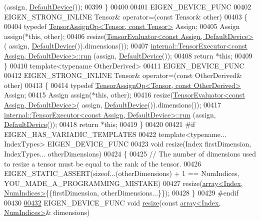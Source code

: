 \begin{DoxyCode}
      (assign, \hyperlink{struct_eigen_1_1_default_device}{DefaultDevice}());
00399     \}
00400 
00401     EIGEN\_DEVICE\_FUNC
00402     EIGEN\_STRONG\_INLINE Tensor& operator=(\textcolor{keyword}{const} Tensor& other)
00403     \{
00404       \textcolor{keyword}{typedef} \hyperlink{class_eigen_1_1_tensor_assign_op}{TensorAssignOp<Tensor, const Tensor>} Assign;
00405       Assign assign(*\textcolor{keyword}{this}, other);
00406       resize(\hyperlink{struct_eigen_1_1_tensor_evaluator}{TensorEvaluator<const Assign, DefaultDevice>}(
      assign, \hyperlink{struct_eigen_1_1_default_device}{DefaultDevice}()).dimensions());
00407       \hyperlink{class_eigen_1_1internal_1_1_tensor_executor}{internal::TensorExecutor<const Assign, DefaultDevice>::run}
      (assign, \hyperlink{struct_eigen_1_1_default_device}{DefaultDevice}());
00408       \textcolor{keywordflow}{return} *\textcolor{keyword}{this};
00409     \}
00410     \textcolor{keyword}{template}<\textcolor{keyword}{typename} OtherDerived>
00411     EIGEN\_DEVICE\_FUNC
00412     EIGEN\_STRONG\_INLINE Tensor& operator=(\textcolor{keyword}{const} OtherDerived& other)
00413     \{
00414       \textcolor{keyword}{typedef} \hyperlink{class_eigen_1_1_tensor_assign_op}{TensorAssignOp<Tensor, const OtherDerived>} Assign;
00415       Assign assign(*\textcolor{keyword}{this}, other);
00416       resize(\hyperlink{struct_eigen_1_1_tensor_evaluator}{TensorEvaluator<const Assign, DefaultDevice>}(
      assign, \hyperlink{struct_eigen_1_1_default_device}{DefaultDevice}()).dimensions());
00417       \hyperlink{class_eigen_1_1internal_1_1_tensor_executor}{internal::TensorExecutor<const Assign, DefaultDevice>::run}
      (assign, \hyperlink{struct_eigen_1_1_default_device}{DefaultDevice}());
00418       \textcolor{keywordflow}{return} *\textcolor{keyword}{this};
00419     \}
00420 
00421 \textcolor{preprocessor}{#if EIGEN\_HAS\_VARIADIC\_TEMPLATES}
00422     \textcolor{keyword}{template}<\textcolor{keyword}{typename}... IndexTypes> EIGEN\_DEVICE\_FUNC
00423     \textcolor{keywordtype}{void} resize(Index firstDimension, IndexTypes... otherDimensions)
00424     \{
00425       \textcolor{comment}{// The number of dimensions used to resize a tensor must be equal to the rank of the tensor.}
00426       EIGEN\_STATIC\_ASSERT(\textcolor{keyword}{sizeof}...(otherDimensions) + 1 == NumIndices, YOU\_MADE\_A\_PROGRAMMING\_MISTAKE)
00427       resize(\hyperlink{class_eigen_1_1array}{array<Index, NumIndices>}\{\{firstDimension, otherDimensions...\}\});
00428     \}
00429 \textcolor{preprocessor}{#endif}
00430 
\hyperlink{class_eigen_1_1_tensor_a5ab1ec6dc9b05d5e4db3600bc9d2cc6b}{00432}     EIGEN\_DEVICE\_FUNC \textcolor{keywordtype}{void} \hyperlink{class_eigen_1_1_tensor_a5ab1ec6dc9b05d5e4db3600bc9d2cc6b}{resize}(\textcolor{keyword}{const} \hyperlink{class_eigen_1_1array}{array<Index, NumIndices>}& dimensions)

\end{DoxyCode}
